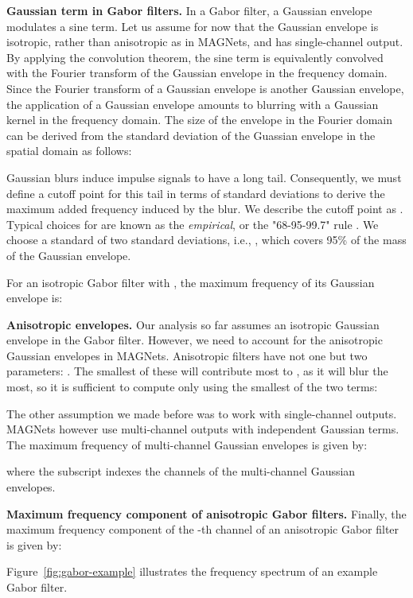 \documentclass{article} \usepackage{iclr2022_conference,times}
\begin{document}
\textbf{Gaussian term in Gabor filters.} In a Gabor filter, a Gaussian envelope modulates a sine term. Let us assume for now that the Gaussian envelope is isotropic, rather than anisotropic as in MAGNets, and has single-channel output. By applying the convolution theorem, the sine term is equivalently convolved with the Fourier transform of the Gaussian envelope in the frequency domain. Since the Fourier transform of a Gaussian envelope is another Gaussian envelope, the application of a Gaussian envelope amounts to blurring with a Gaussian kernel in the frequency domain. The size of the envelope in the Fourier domain  can be derived from the standard deviation of the Guassian envelope in the spatial domain  as follows:

Gaussian blurs induce impulse signals to have a long tail. Consequently, we must define a cutoff point for this tail in terms of standard deviations to derive the maximum added frequency induced by the blur. We describe the cutoff point as . Typical choices for  are known as the \textit{empirical}, or the "68-95-99.7" rule \citep{hald2007moivre}. We choose a standard of two standard deviations, i.e., , which covers 95\% of the mass of the Gaussian envelope.

For an isotropic Gabor filter with , the maximum frequency of its Gaussian envelope  is:

\textbf{Anisotropic envelopes.} Our analysis so far assumes an isotropic Gaussian envelope in the Gabor filter. However, we need to account for the anisotropic Gaussian envelopes in MAGNets. Anisotropic filters have not one but two  parameters: . The smallest of these will contribute most to , as it will blur the most, so it is sufficient to compute  only using the smallest of the two  terms:

The other assumption we made before was to work with single-channel outputs. MAGNets however use multi-channel outputs with independent Gaussian terms. The maximum frequency of multi-channel Gaussian envelopes is given by:

where the subscript  indexes the channels of the multi-channel Gaussian envelopes.


\textbf{Maximum frequency component of anisotropic Gabor filters.} Finally, the maximum frequency component of the -th channel of an anisotropic Gabor filter  is given by:

Figure~\ref{fig:gabor-example} illustrates the frequency spectrum of an example Gabor filter.
\end{document}
